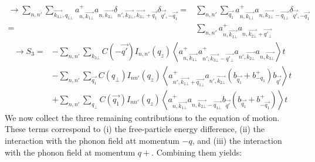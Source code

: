 \documentclass{article}
\begin{document}
\begin{align*}
    \rightarrow \sum_{n,n'} \sum_{\vec{k_{3\bot}},q_{1\bot}} a^+_{n, \vec{k_{1\bot}}} a_{n, \vec{k_{3\bot}}} \delta_{n', \vec{k_{2\bot}}, \vec{k_{3\bot}} + \vec{q_1}}\delta_{\vec{q'}, - \vec{q_1}}= & \sum_{n,n'} \sum_{\vec{q_1}} a^+_{n, \vec{k_{1\bot}}} a_{n, \vec{k_{2\bot}} - \vec{q_{1\bot}}}\delta_{\vec{q'}, - \vec{q_1}}\\
    = & \sum_{n,n'} a^+_{n, \vec{k_{1\bot}}} a_{n, \vec{k_{2\bot}} + \vec{q'_{\bot}}}
\end{align*}
\begin{align*}
    \rightarrow S_3 = & - \sum_{n,n'} \sum_{k_{3\bot}} C \left(- \vec{q'}\right) I _{n,n'} \left(q_z\right) \left \langle a^+_{n, \vec{k_{1\bot}}} a^+_{n', \vec{k_{3\bot}} - \vec{q'_{\bot}}}a_{n', \vec{k_{2\bot}}} a_{n, \vec{k_{3\bot}}}\right \rangle t \\
    & - \sum_{n,n'} \sum_{\vec{q_1}} C \left(q_\bot\right) I_{n n'} \left(q_z \right) \left \langle a^+_{n', \vec{k_{1\bot}} + \vec{q_{1\bot}}}a_{n', \vec{k_{2\bot}}}\left(b_{\vec{q_1}}+ b^+_{- q_1}\right) b_{\vec{q'}}\right \rangle t \\
    & + \sum_{n,n'} \sum_{q_\bot} C \left(\vec{q_1} \right) I_{nn'} \left(q_z\right) \left \langle a^+_{n, \vec{k_{1\bot}}} a_{n, \vec{k_{2\bot}} - \vec{q_{1\bot}}}b_{\vec{q'}} \left(b_{\vec{q_1}}+b^+_{- \vec{q_1}}\right) \right \rangle t
\end{align*}
We now collect the three remaining contributions to the equation of motion. These terms correspond to (i) the free-particle energy difference, (ii) the interaction with the phonon field att momentum $-q$, and (iii) the interaction with the phonon field at momentum $q+$. Combining them yields: 
\end{document}
